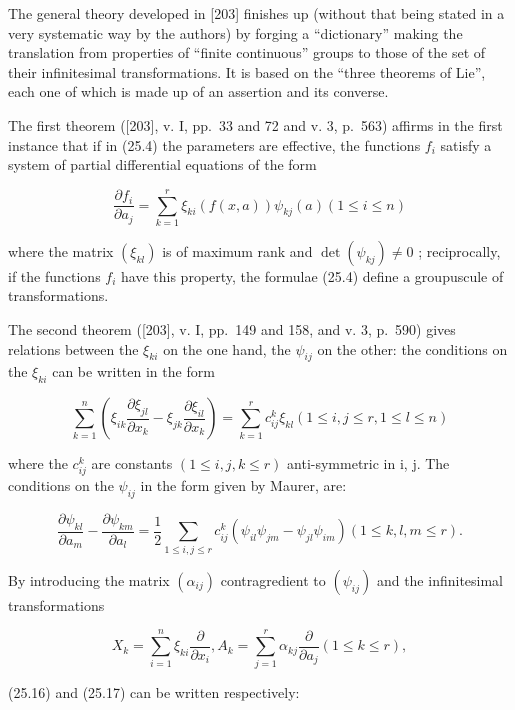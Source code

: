 The general theory developed in {[}203{]} finishes up (without that being stated in a very systematic way by the authors) by forging a ``dictionary'' making the translation from properties of ``finite continuous'' groups to those of the set of their infinitesimal transformations. It is based on the ``three theorems of Lie'', each one of which is made up of an assertion and its converse.

The first theorem ({[}203{]}, v. I, pp.~33 and 72 and v. 3, p.~563) affirms in the first instance that if in (25.4) the parameters are effective, the functions \(f_{i}\) satisfy a system of partial differential equations of the form

\[
\frac {\partial f _ {i}}{\partial a _ {j}} = \sum_ {k = 1} ^ {r} \xi_ {k i} (f (x, a)) \psi_ {k j} (a) (1 \leq i \leq n)\tag{25.15}
\]

where the matrix \((\xi_{kl})\) is of maximum rank and \(\det(\psi_{kj}) \neq 0\) ; reciprocally, if the functions \(f_{i}\) have this property, the formulae (25.4) define a groupuscule of transformations.

The second theorem ({[}203{]}, v. I, pp.~149 and 158, and v. 3, p.~590) gives relations between the \(\xi_{ki}\) on the one hand, the \(\psi_{ij}\) on the other: the conditions on the \(\xi_{ki}\) can be written in the form

\[
\sum_ {k = 1} ^ {n} \left(\xi_ {i k} \frac {\partial \xi_ {j l}}{\partial x _ {k}} - \xi_ {j k} \frac {\partial \xi_ {i l}}{\partial x _ {k}}\right) = \sum_ {k = 1} ^ {r} c _ {i j} ^ {k} \xi_ {k l} (1 \leq i, j \leq r, 1 \leq l \leq n)\tag{25.16}
\]

where the \(c_{ij}^{k}\) are constants \((1 \leq i, j, k \leq r)\) anti-symmetric in i, j. The conditions on the \(\psi_{ij}\) in the form given by Maurer, are:

\[
\frac {\partial \psi_ {k l}}{\partial a _ {m}} - \frac {\partial \psi_ {k m}}{\partial a _ {l}} = \frac {1}{2} \sum_ {1 \leq i, j \leq r} c _ {i j} ^ {k} (\psi_ {i l} \psi_ {j m} - \psi_ {j l} \psi_ {i m}) (1 \leq k, l, m \leq r).\tag{25.17}
\]

By introducing the matrix \((\alpha_{ij})\) contragredient to \((\psi_{ij})\) and the infinitesimal transformations

\[
X _ {k} = \sum_ {i = 1} ^ {n} \xi_ {k i} \frac {\partial}{\partial x _ {i}}, A _ {k} = \sum_ {j = 1} ^ {r} \alpha_ {k j} \frac {\partial}{\partial a _ {j}} (1 \leq k \leq r),\tag{25.18}
\]

(25.16) and (25.17) can be written respectively:

